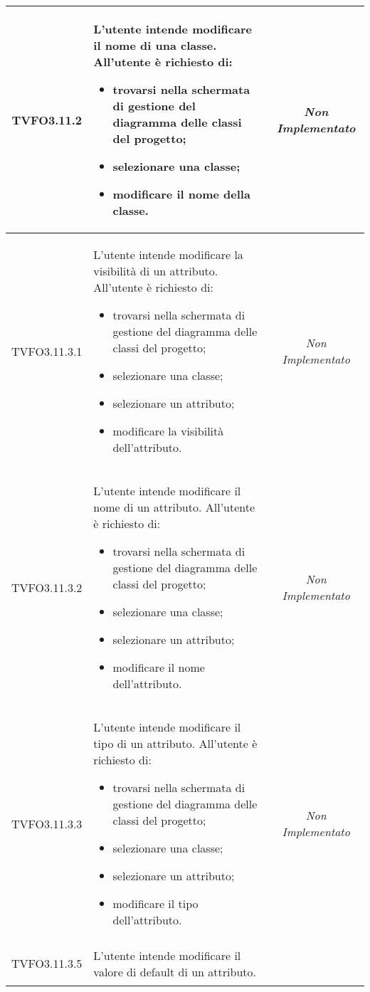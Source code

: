 \begin{longtable}{|c|>{}m{8cm}|c|}
\hypertarget{TVFO3.11.2}{TVFO3.11.2} & L'utente intende modificare il nome di una classe.
All'utente è richiesto di:
\begin{itemize}
	\item trovarsi nella schermata di gestione del diagramma delle classi del progetto;
	\item selezionare una classe;
	\item modificare il nome della classe.
\end{itemize} & \textit{Non Implementato}\\ \hline
\hypertarget{TVFO3.11.3.1}{TVFO3.11.3.1} & L'utente intende modificare la visibilità di un attributo.
All'utente è richiesto di:
\begin{itemize}
	\item trovarsi nella schermata di gestione del diagramma delle classi del progetto;
	\item selezionare una classe;
	\item selezionare un attributo;
	\item modificare la visibilità dell'attributo.
\end{itemize} & \textit{Non Implementato}\\ \hline
\hypertarget{TVFO3.11.3.2}{TVFO3.11.3.2} & L'utente intende modificare il nome di un attributo.
All'utente è richiesto di:
\begin{itemize}
	\item trovarsi nella schermata di gestione del diagramma delle classi del progetto;
	\item selezionare una classe;
	\item selezionare un attributo;
	\item modificare il nome dell'attributo.
\end{itemize} & \textit{Non Implementato}\\ \hline
\hypertarget{TVFO3.11.3.3}{TVFO3.11.3.3} & L'utente intende modificare il tipo di un attributo.
All'utente è richiesto di:
\begin{itemize}
	\item trovarsi nella schermata di gestione del diagramma delle classi del progetto;
	\item selezionare una classe;
	\item selezionare un attributo;
	\item modificare il tipo dell'attributo.
\end{itemize} & \textit{Non Implementato}\\ \hline
\hypertarget{TVFO3.11.3.5}{TVFO3.11.3.5} & L'utente intende modificare il valore di default di un attributo.

\end{longtable}

